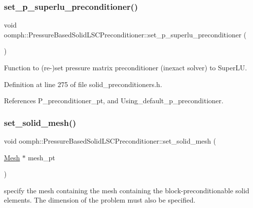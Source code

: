 \subsubsection{\texorpdfstring{set\+\_\+p\+\_\+superlu\+\_\+preconditioner()}{set\_p\_superlu\_preconditioner()}}
{\footnotesize\ttfamily void oomph\+::\+Pressure\+Based\+Solid\+L\+S\+C\+Preconditioner\+::set\+\_\+p\+\_\+superlu\+\_\+preconditioner (\begin{DoxyParamCaption}{ }\end{DoxyParamCaption})\hspace{0.3cm}{\ttfamily [inline]}}



Function to (re-\/)set pressure matrix preconditioner (inexact solver) to Super\+LU. 



Definition at line 275 of file solid\+\_\+preconditioners.\+h.



References P\+\_\+preconditioner\+\_\+pt, and Using\+\_\+default\+\_\+p\+\_\+preconditioner.

\mbox{\label{classoomph_1_1PressureBasedSolidLSCPreconditioner_ad432b40acc45b0f8f065c96154f64240}} 
\subsubsection{\texorpdfstring{set\+\_\+solid\+\_\+mesh()}{set\_solid\_mesh()}}
{\footnotesize\ttfamily void oomph\+::\+Pressure\+Based\+Solid\+L\+S\+C\+Preconditioner\+::set\+\_\+solid\+\_\+mesh (\begin{DoxyParamCaption}\item[{\hyperlink{classoomph_1_1Mesh}{Mesh} $\ast$}]{mesh\+\_\+pt }\end{DoxyParamCaption})\hspace{0.3cm}{\ttfamily [inline]}}

specify the mesh containing the mesh containing the block-\/preconditionable solid elements. The dimension of the problem must also be specified. 

